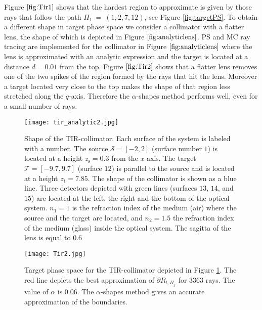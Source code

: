  Figure $\ref{fig:Tir1}$ shows that the hardest region to approximate is given by those rays that follow the path $\Pi_1 ~=~ (1,2,7,12)$, see Figure \ref{fig:targetPS}.
 To obtain a different shape in target phase space we consider a collimator with a flatter lens, the shape of which is depicted in Figure $\ref{fig:analyticlens}$. PS and MC ray tracing are implemented for the collimator in Figure $\ref{fig:analyticlens}$ where the lens is approximated with an analytic expression and the target is located
at a distance $d = 0.01$ from the top. Figure $\ref{fig:Tir2}$ shows that a flatter lens removes one of the two spikes of the region formed by the rays that hit the lens.
Moreover a target located very close to the top makes the shape of that region less stretched along the $q$-axis.
Therefore the $\alpha$-shapes method performs well, even for a small number of rays.
\begin{figure}[h]
  \begin{center}
  \texttt{[image: tir\_analytic2.jpg]}
   \end{center}
    \caption{\footnotesize{Shape of the TIR-collimator. Each surface of the system is labeled with a number.
       The source $\mathcal{S}= [-2,2]$ (surface number $1$) is located at a height $z_{\textrm{s}} = 0.3$ from the $x$-axis.
       The target $\mathcal{T}= [-9.7, 9.7]$ (surface $12$) is parallel to the source and is located at a height $ z_{\textrm{t}}= 7.85$.
       The shape of the collimator is shown as a blue line.
       Three detectors depicted with green lines (surfaces $13$, $14$, and $15$) are located at the left, the right and the bottom of the optical system.
       $n_1 = 1$ is the refraction index of the medium (air) where the source and the target are located, and
       $n_2 = 1.5 $ the refraction index of the medium (glass) inside the optical system. The sagitta of the lens is equal to $0.6$}}
 \label{fig:analyticlens}
\end{figure}

 \begin{figure}[h]
  \begin{center}
       \texttt{[image: Tir2.jpg]}
   \end{center}
        \caption{\footnotesize{Target phase space for the TIR-collimator depicted in
        Figure \ref{fig:analyticlens}. The red line depicts the best approximation of $\partial{R_{t, \Pi_j}}$ for $3363$ rays. The value of $\alpha$ is $0.06$.
        The $\alpha$-shapes method gives an accurate approximation of the boundaries.}}
  \label{fig:Tir2}
\end{figure}


